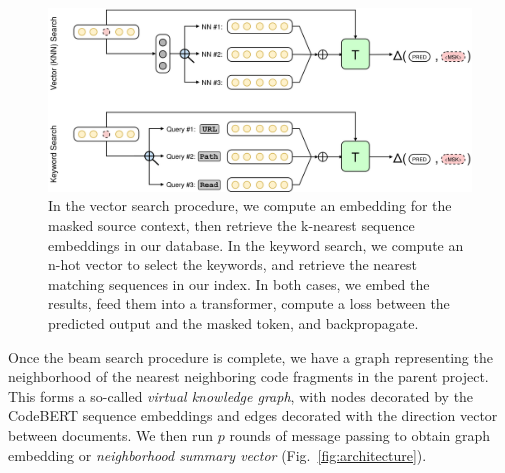 \documentclass[11pt]{article}
\begin{document}
\begin{figure}[H]
  \centering
  \includegraphics[width=\textwidth]{knn_vs_vec}
  \caption{In the vector search procedure, we compute an embedding for the masked source context, then retrieve the k-nearest sequence embeddings in our database. In the keyword search, we compute an n-hot vector to select the keywords, and retrieve the nearest matching sequences in our index. In both cases, we embed the results, feed them into a transformer, compute a loss between the predicted output and the masked token, and backpropagate.}
  \label{fig:pipeline}
\end{figure}

Once the beam search procedure is complete, we have a graph representing the neighborhood of the nearest neighboring code fragments in the parent project. This forms a so-called \textit{virtual knowledge graph}, with nodes decorated by the CodeBERT sequence embeddings and edges decorated with the direction vector between documents. We then run $p$ rounds of message passing to obtain graph embedding or \textit{neighborhood summary vector} (Fig.~\ref{fig:architecture}).

%
\end{document}
